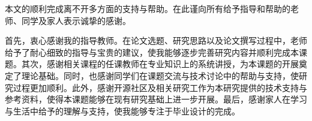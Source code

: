 
\begin{thankscontent}

    本文的顺利完成离不开多方面的支持与帮助。在此谨向所有给予指导和帮助的老师、同学及家人表示诚挚的感谢。
    
    首先，衷心感谢我的指导教师。在论文选题、研究思路以及论文撰写过程中，老师给予了耐心细致的指导与宝贵的建议，使我能够逐步完善研究内容并顺利完成本课题。其次，感谢相关课程的任课教师在专业知识上的系统讲授，为本课题的开展奠定了理论基础。同时，也感谢同学们在课题交流与技术讨论中的帮助与支持，使研究过程更加顺利。此外，感谢开源社区及相关研究工作为本研究提供的技术支持与参考资料，使得本课题能够在现有研究基础上进一步开展。最后，感谢家人在学习与生活中给予的理解与支持，使我能够专注于毕业设计的完成。
    
    \end{thankscontent}